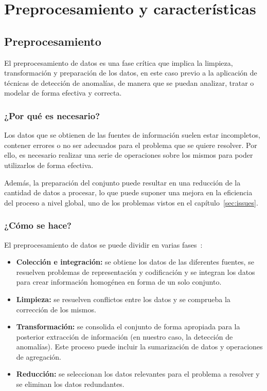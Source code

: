 \chapter{Preprocesamiento y características}
\section{Preprocesamiento}\label{sec:pre}
El preprocesamiento de datos es una fase crítica que implica la limpieza,
transformación y preparación de los datos, en este caso previo a la aplicación
de técnicas de detección de anomalías, de manera que se puedan analizar, tratar
o modelar de forma efectiva y correcta.

\nocite{herrera2004pre}
\subsection{¿Por qué es necesario?}
Los datos que se obtienen de las fuentes de información suelen estar incompletos,
contener errores o no ser adecuados para el problema que se quiere resolver.
Por ello, es necesario realizar una serie de operaciones sobre los mismos para
poder utilizarlos de forma efectiva.

Además, la preparación del conjunto puede resultar en una reducción de la cantidad
de datos a procesar, lo que puede suponer una mejora en la eficiencia del proceso
a nivel global, uno de los problemas vistos en el capítulo~\ref{sec:issues}.

\subsection{¿Cómo se hace?}
El preprocesamiento de datos se puede dividir en varias fases~\cite{zhang2003data}:

\begin{itemize}[topsep=0pt]
	\item \textbf{Colección e integración:} se obtiene los datos de las diferentes fuentes, se
		resuelven problemas de representación y codificación y se integran los datos para crear
		información homogénea en forma de un solo conjunto.~\cite{detours2003integration}
	\item \textbf{Limpieza:} se resuelven conflictos entre los datos y se comprueba la corrección
		de los mismos.~\cite{kim2003taxonomy}
	\item \textbf{Transformación:} se consolida el conjunto de forma apropiada para la posterior
		extracción de información (en nuestro caso, la detección de anomalías). Este proceso puede
		incluir la sumarización de datos y operaciones de agregación.~\cite{lin2002attribute}
	\item \textbf{Reducción:} se seleccionan los datos relevantes para el problema a resolver y se
		eliminan los datos redundantes.~\cite{liu2012feature}
\end{itemize}
\newpage{}
